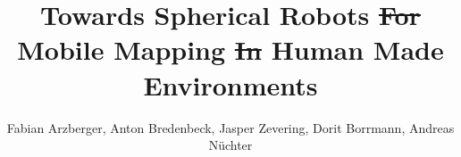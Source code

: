 \documentclass[5p]{elsarticle}
\providecommand{\DIFaddtex}[1]{{\protect\color{blue}\uwave{#1}}} %
\providecommand{\DIFdeltex}[1]{{\protect\color{red}\sout{#1}}}                      %
\providecommand{\DIFaddbegin}{} %
\providecommand{\DIFaddend}{} %
\providecommand{\DIFdelbegin}{} %
\providecommand{\DIFdelend}{} %
\providecommand{\DIFadd}[1]{\texorpdfstring{\DIFaddtex{#1}}{#1}} %
\providecommand{\DIFdel}[1]{\texorpdfstring{\DIFdeltex{#1}}{}} %
\begin{document}
\begin{frontmatter}

\title{Towards Spherical Robots \DIFdelbegin \DIFdel{For }\DIFdelend \DIFaddbegin \DIFadd{for }\DIFaddend Mobile Mapping \DIFdelbegin \DIFdel{In }\DIFdelend \DIFaddbegin \DIFadd{in }\DIFaddend Human Made Environments}

\author{Fabian Arzberger, Anton Bredenbeck, Jasper Zevering, Dorit Borrmann, Andreas Nüchter}
\address{Informatics VII: Robotics and Telematics,
Julius-Maximilians-University Würzburg, Germany\\
e-mail: dorit.borrmann@uni-wuerzburg.de}





\end{frontmatter}
\end{document}
